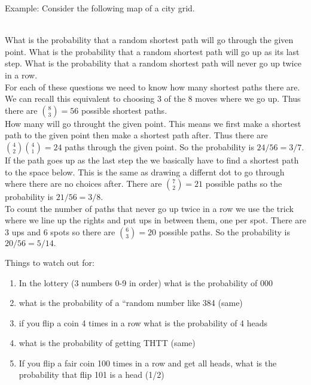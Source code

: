 \documentclass[14,fleqn]{article}
\begin{document}
Example: Consider the following map of a city grid.\\
\\
What is the probability that a random shortest path will go through the given point. What is the probability that a random shortest path will go up as its last step. What is the probability that a random shortest path will never go up twice in a row.\\

For each of these questions we need to know how many shortest paths there are. We can recall this equivalent to choosing 3 of the 8 moves where we go up. Thus there are $\binom{8}{3}=56$ possible shortest paths.\\

How many will go throught the given point. This means we first make a shortest path to the given point then make a shortest path after. Thus there are $\binom{4}{2}\binom{4}{1}=24$ paths through the given point. So the probability is $24/56=3/7.$\\

If the path goes up as the last step the we basically have to find a shortest path to the space below. This is the same as drawing a differnt dot to go through where there are no choices after. There are $\binom{7}{2}=21$ possible paths so the probability is $21/56=3/8.$\\

To count the number of paths that never go up twice in a row we use the trick where we line up the rights and put ups in between them, one per spot. There are 3 ups and 6 spots so there are $\binom{6}{3}=20$ possible paths. So the probability is $20/56=5/14.$

Things to watch out for:
\begin{enumerate}
	\item In the lottery (3 numbers 0-9 in order) what is the probability of 000
	\item what is the probability of a ``random number like 384 (same)
	\item if you flip a coin 4 times in a row what is the probability of 4 heads
	\item what is the probability of getting THTT (same)
	\item If you flip a fair coin 100 times in a row and get all heads, what is the probability that flip 101 is a head (1/2)
\end{enumerate}
\end{document}
